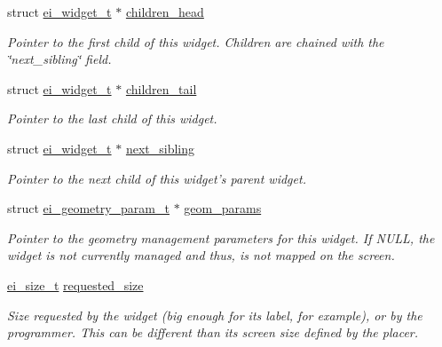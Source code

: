\begin{DoxyCompactItemize}
struct \hyperlink{structei__widget__t}{ei\_\-widget\_\-t} $\ast$ \hyperlink{structei__widget__t_a190316f0ec41d2d98b919414c860f828}{children\_\-head}
\begin{DoxyCompactList}\small\item\em Pointer to the first child of this widget. Children are chained with the \char`\"{}next\_\-sibling\char`\"{} field. \item\end{DoxyCompactList}\item 
struct \hyperlink{structei__widget__t}{ei\_\-widget\_\-t} $\ast$ \hyperlink{structei__widget__t_aece2f3059f252538ae787857e7eea2a2}{children\_\-tail}
\begin{DoxyCompactList}\small\item\em Pointer to the last child of this widget. \item\end{DoxyCompactList}\item 
struct \hyperlink{structei__widget__t}{ei\_\-widget\_\-t} $\ast$ \hyperlink{structei__widget__t_ada15cedaf8e6e104a1461c1754ff6cb3}{next\_\-sibling}
\begin{DoxyCompactList}\small\item\em Pointer to the next child of this widget's parent widget. \item\end{DoxyCompactList}\item 
struct \hyperlink{structei__geometry__param__t}{ei\_\-geometry\_\-param\_\-t} $\ast$ \hyperlink{structei__widget__t_a31885277c641803a931fff1d6256203f}{geom\_\-params}
\begin{DoxyCompactList}\small\item\em Pointer to the geometry management parameters for this widget. If NULL, the widget is not currently managed and thus, is not mapped on the screen. \item\end{DoxyCompactList}\item 
\hyperlink{structei__size__t}{ei\_\-size\_\-t} \hyperlink{structei__widget__t_ae82b19958b3ec72a855986dffb9b92ea}{requested\_\-size}
\begin{DoxyCompactList}\small\item\em Size requested by the widget (big enough for its label, for example), or by the programmer. This can be different than its screen size defined by the placer. \item\end{DoxyCompactList}\item 

\end{DoxyCompactItemize}
